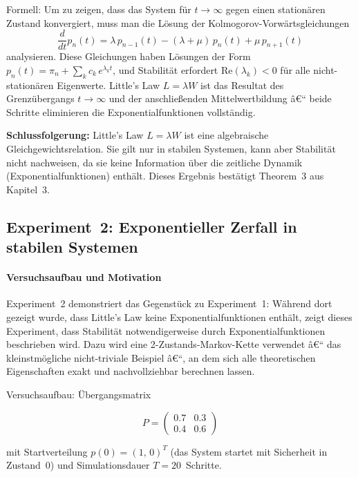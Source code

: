 ﻿\documentclass[a4paper,12pt]{report}
\theoremstyle{definition}
\begin{document}
Formell: Um zu zeigen, dass das System für $t \to \infty$ gegen einen
stationären Zustand konvergiert, muss man die Lösung der
Kolmogorov-Vorwärtsgleichungen
\[
\frac{d}{dt}p_n(t) = \lambda\, p_{n-1}(t) - (\lambda+\mu)\,p_n(t)
+ \mu\, p_{n+1}(t)
\]
analysieren.  Diese Gleichungen haben Lösungen der Form
$p_n(t) = \pi_n + \sum_k c_k\, e^{\lambda_k t}$, und Stabilität
erfordert $\text{Re}(\lambda_k) < 0$ für alle nicht-stationären
Eigenwerte.  Little's Law $L = \lambda W$ ist das Resultat des
Grenzübergangs $t \to \infty$ und der anschließenden
Mittelwertbildung â€“ beide Schritte eliminieren die
Exponentialfunktionen vollständig.

\textbf{Schlussfolgerung:} Little's Law $L = \lambda W$ ist eine
algebraische Gleichgewichtsrelation.  Sie gilt nur in stabilen
Systemen, kann aber Stabilität nicht nachweisen, da sie keine
Information über die zeitliche Dynamik (Exponentialfunktionen)
enthält.  Dieses Ergebnis bestätigt Theorem~3 aus Kapitel~3.

\subsection{Experiment~2: Exponentieller Zerfall in stabilen Systemen}
\label{subsubsec:exp2}

\paragraph{Versuchsaufbau und Motivation}

Experiment~2 demonstriert das Gegenstück zu Experiment~1: Während
dort gezeigt wurde, dass Little's Law keine Exponentialfunktionen
enthält, zeigt dieses Experiment, dass Stabilität notwendigerweise
durch Exponentialfunktionen beschrieben wird.  Dazu wird eine
2-Zustands-Markov-Kette verwendet â€“ das kleinstmögliche nicht-triviale
Beispiel â€“, an dem sich alle theoretischen Eigenschaften exakt und
nachvollziehbar berechnen lassen.

Versuchsaufbau: Übergangsmatrix

\begin{equation}
	P = \begin{pmatrix} 0.7 & 0.3 \\ 0.4 & 0.6 \end{pmatrix}
\end{equation}

mit Startverteilung $p(0) = (1,\, 0)^T$ (das System startet mit
Sicherheit in Zustand~0) und Simulationsdauer $T = 20$~Schritte.
\end{document}
